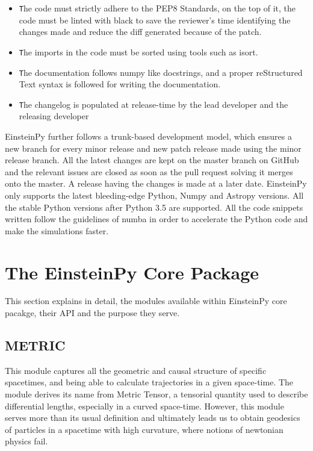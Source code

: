 \documentclass{aastex63}
\begin{document}
\begin{itemize}
\item \texttt The code must strictly adhere to the PEP8 Standards, on the top of it, the code must be linted with black to save the reviewer’s time identifying the changes made and reduce the diff generated because of the patch.
\item \texttt The imports in the code must be sorted using tools such as isort. 
\item \texttt The documentation follows numpy like docstrings, and a proper reStructured Text syntax is followed for writing the documentation.
\item \texttt The changelog is populated at release-time by the lead developer and the releasing developer
\end{itemize}
EinsteinPy further follows a trunk-based development model, which ensures a new branch for every minor release and new patch release made using the minor release branch. All the latest changes are kept on the master branch on GitHub and the relevant issues are closed as soon as the pull request solving it merges onto the master. A release having the changes is made at a later date. 
EinsteinPy only supports the latest bleeding-edge Python, Numpy and Astropy versions.  All the stable Python versions after Python 3.5 are supported. All the code snippets written follow the guidelines of numba in order to accelerate the Python code and make the simulations faster. 




\section{The EinsteinPy Core Package} \label{sec:core}
This section explains in detail, the modules available within EinsteinPy core pacakge, their API and the purpose they serve.
\subsection{METRIC} \label{subsec:metric}
This module captures all the geometric and causal structure of specific spacetimes, and being able to calculate trajectories in a given space-time. 
The module derives its name from Metric Tensor, a tensorial quantity used to describe differential lengths, especially in a curved space-time. 
However, this module serves more than its usual definition and ultimately leads us to obtain geodesics of particles in a spacetime with high curvature, where notions of newtonian physics fail.
\end{document}

